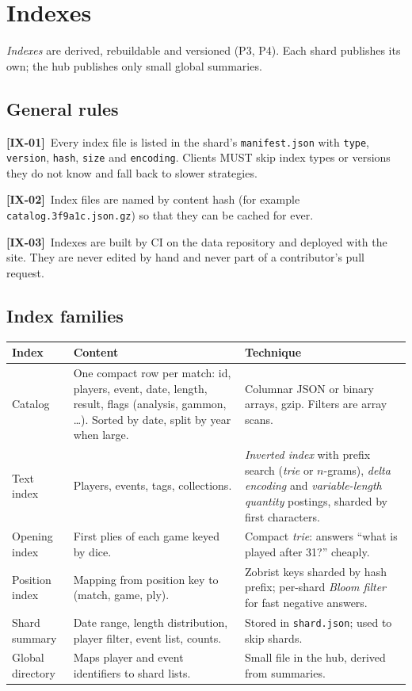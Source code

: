 \documentclass[11pt,a4paper]{article}
\newcommand{\kw}[1]{\textit{#1}\index{#1}}
\newcommand{\req}[2]{\par\smallskip\noindent\hypertarget{#1}{}\textbf{[#1]}\ #2\par}
\begin{document}
\section{Indexes}\label{sec:indexes}
\kw{Indexes} are derived, rebuildable and versioned (P3, P4). Each shard publishes its own; the hub publishes only small global summaries.

\subsection{General rules}
\req{IX-01}{Every index file is listed in the shard's \texttt{manifest.json} with \texttt{type}, \texttt{version}, \texttt{hash}, \texttt{size} and \texttt{encoding}. Clients MUST skip index types or versions they do not know and fall back to slower strategies.}
\req{IX-02}{Index files are named by content hash (for example \texttt{catalog.3f9a1c.json.gz}) so that they can be cached for ever.}
\req{IX-03}{Indexes are built by CI on the data repository and deployed with the site. They are never edited by hand and never part of a contributor's pull request.}

\subsection{Index families}
\begin{longtable}{@{}p{2.7cm}p{6cm}p{5.6cm}@{}}
\toprule
\textbf{Index} & \textbf{Content} & \textbf{Technique}\\
\midrule
\endhead
Catalog & One compact row per match: id, players, event, date, length, result, flags (analysis, gammon, \ldots). Sorted by date, split by year when large. & Columnar JSON or binary arrays, gzip. Filters are array scans.\\
Text index & Players, events, tags, collections. & \kw{Inverted index} with prefix search (\kw{trie} or $n$-grams), \kw{delta encoding} and \kw{variable-length quantity} postings, sharded by first characters.\\
Opening index & First plies of each game keyed by dice. & Compact \kw{trie}: answers ``what is played after 31?'' cheaply.\\
Position index & Mapping from position key to (match, game, ply). & Zobrist keys sharded by hash prefix; per-shard \kw{Bloom filter} for fast negative answers.\\
Shard summary & Date range, length distribution, player filter, event list, counts. & Stored in \texttt{shard.json}; used to skip shards.\\
Global directory & Maps player and event identifiers to shard lists. & Small file in the hub, derived from summaries.\\
\bottomrule
\end{longtable}
\end{document}
